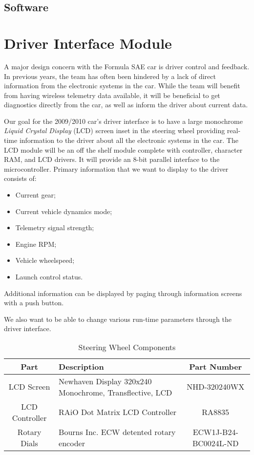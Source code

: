 \subsection{Software}

%
%

\section{Driver Interface Module}

A major design concern with the Formula SAE car is driver control and feedback. In previous years, the team has often been hindered by a lack of direct information from the electronic systems in the car. While the team will benefit from having wireless telemetry data available, it will be beneficial to get diagnostics directly from the car, as well as inform the driver about current data.

Our goal for the 2009/2010 car's driver interface is to have a large monochrome \emph{Liquid Crystal Display} (LCD) screen inset in the steering wheel providing real-time information to the driver about all the electronic systems in the car. The LCD module will be an off the shelf module complete with controller, character RAM, and LCD drivers. It will provide an 8-bit parallel interface to the microcontroller. Primary information that we want to display to the driver consists of:
\begin{itemize}
\item Current gear;
\item Current vehicle dynamics mode;
\item Telemetry signal strength;
\item Engine RPM;
\item Vehicle wheelspeed;
\item Launch control status.
\end{itemize}
Additional information can be displayed by paging through information screens with a push button.

We also want to be able to change various run-time parameters through the driver interface.

\begin{table}[H]
\caption{Steering Wheel Components\label{tab:Steering-Wheel-Components}}

\centering{}\begin{tabular}{|c|>{\centering}p{15em}|c|}
\hline 
Part & Description & Part Number\tabularnewline
\hline
\hline 
LCD Screen & Newhaven Display 320x240 Monochrome, Transflective, LCD & NHD-320240WX\tabularnewline
\hline 
LCD Controller & RAiO Dot Matrix LCD Controller & RA8835\tabularnewline
\hline 
Rotary Dials & Bourns Inc. ECW detented rotary encoder & ECW1J-B24-BC0024L-ND\tabularnewline
\hline
\end{tabular}
\end{table}

